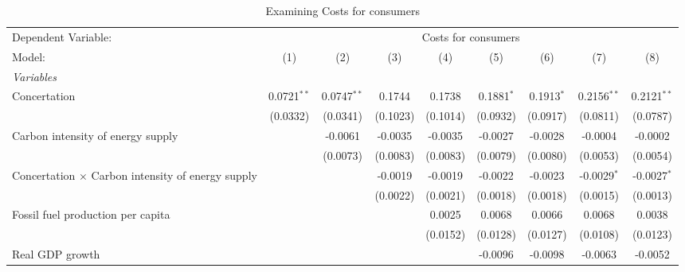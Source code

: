
\begin{table}[htbp]
   \caption{Examining Costs for consumers}
   \centering
   \begin{tabular}{lcccccccc}
      \tabularnewline \midrule \midrule
      Dependent Variable: & \multicolumn{8}{c}{Costs for consumers}\\
      Model:                                                   & (1)           & (2)           & (3)      & (4)      & (5)          & (6)          & (7)           & (8)\\  
      \midrule
      \emph{Variables}\\
      Concertation                                             & 0.0721$^{**}$ & 0.0747$^{**}$ & 0.1744   & 0.1738   & 0.1881$^{*}$ & 0.1913$^{*}$ & 0.2156$^{**}$ & 0.2121$^{**}$\\   
                                                               & (0.0332)      & (0.0341)      & (0.1023) & (0.1014) & (0.0932)     & (0.0917)     & (0.0811)      & (0.0787)\\   
      Carbon intensity of energy supply                        &               & -0.0061       & -0.0035  & -0.0035  & -0.0027      & -0.0028      & -0.0004       & -0.0002\\   
                                                               &               & (0.0073)      & (0.0083) & (0.0083) & (0.0079)     & (0.0080)     & (0.0053)      & (0.0054)\\   
      Concertation $\times$ Carbon intensity of energy supply  &               &               & -0.0019  & -0.0019  & -0.0022      & -0.0023      & -0.0029$^{*}$ & -0.0027$^{*}$\\   
                                                               &               &               & (0.0022) & (0.0021) & (0.0018)     & (0.0018)     & (0.0015)      & (0.0013)\\   
      Fossil fuel production per capita                        &               &               &          & 0.0025   & 0.0068       & 0.0066       & 0.0068        & 0.0038\\   
                                                               &               &               &          & (0.0152) & (0.0128)     & (0.0127)     & (0.0108)      & (0.0123)\\   
      Real GDP growth                                          &               &               &          &          & -0.0096      & -0.0098      & -0.0063       & -0.0052\\   

\end{tabular}
\end{table}
